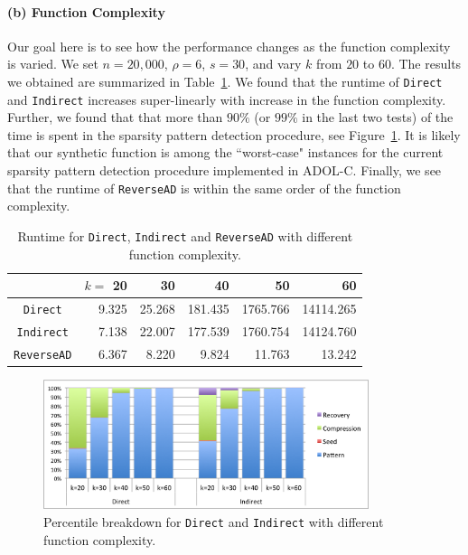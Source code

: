 \documentclass[final,leqno,onefignum,onetabnum]{siamart}
\begin{document}
\paragraph{(b) Function Complexity} 
Our goal here is to see how the performance changes as the function complexity is varied.
We set $n = 20,000$, $\rho = 6$, $s = 30$, and vary $k$ from $20$ to $60$. 
The results we obtained are summarized in Table~\ref{tab:complexity}.
We found that the runtime of {\tt Direct} and {\tt Indirect} increases super-linearly with increase in the function complexity. Further, we found that that more than $90\%$ (or $99\%$ in the last two tests) of the time is spent in the sparsity pattern detection procedure, see Figure~\ref{fig:complexity-percentile}. It is likely that our synthetic function is among the ``worst-case" instances for the current sparsity pattern detection procedure implemented in ADOL-C.  Finally, we see that the runtime of {\tt ReverseAD} is within the same order of the function complexity.
\begin{table}[htbp]
\begin{center}
\begin{tabular}{ | c | r | r | r | r | r |}
\hline
 & $k=$ 20 & 30 & 40 & 50 & 60 \\
\hline
{\tt Direct} & 9.325 & 25.268 &181.435 &1765.766 & 14114.265\\
{\tt Indirect} & 7.138 & 22.007 & 177.539 & 1760.754 & 14124.760\\
{\tt ReverseAD}  & 6.367 & 8.220 & 9.824 & 11.763 & 13.242\\
\hline 
\end{tabular}
\caption{Runtime for {\tt Direct}, {\tt Indirect} and {\tt ReverseAD} with different function complexity.}
\label{tab:complexity}
\end{center}
\end{table}

\begin{figure}[htbp]
        \centering
        \includegraphics[width=0.85\textwidth]{figures/pb}
        \caption{Percentile breakdown for {\tt Direct} and {\tt Indirect} with different function complexity.}
        \label{fig:complexity-percentile}
\end{figure}
\end{document}
